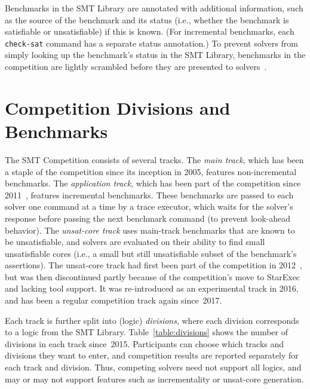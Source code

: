 \documentclass[twoside,11pt]{article}
\begin{document}
Benchmarks in the SMT Library are annotated with additional
information, such as the source of the benchmark and its status (i.e.,
whether the benchmark is satisfiable or unsatisfiable) if this is
known.  (For incremental benchmarks, each {\tt check-sat} command has
a separate status annotation.)  To prevent solvers from simply looking
up the benchmark's status in the SMT Library, benchmarks in the
competition are lightly scrambled before they are presented to
solvers~\cite{DBLP:conf/cade/Weber16}.


\section{Competition Divisions and Benchmarks}
\label{sec:benchmarks}

The SMT Competition consists of several tracks.  The \emph{main
  track}, which has been a staple of the competition since its
inception in 2005, features non-incremental benchmarks.  The
\emph{application track}, which has been part of the competition since
2011~\cite{BDdMOS13}, features incremental benchmarks.  These
benchmarks are passed to each solver one command at a time by a trace
executor, which waits for the solver's response before passing the
next benchmark command (to prevent look-ahead behavior).  The
\emph{unsat-core track} uses main-track benchmarks that are known to
be unsatisfiable, and solvers are evaluated on their ability to find
small unsatisfiable cores (i.e., a small but still unsatisfiable
subset of the benchmark's assertions).  The unsat-core track had first
been part of the competition in 2012~\cite{CGBD12}, but was then
discontinued partly because of the competition's move to StarExec and
lacking tool support.  It was re-introduced as an experimental track
in 2016, and has been a regular competition track again since~2017.

Each track is further split into (logic) \emph{divisions}, where each
division corresponds to a logic from the SMT Library.
Table~\ref{table:divisions} shows the number of divisions in each
track since~2015.  Participants can choose which tracks and divisions
they want to enter, and competition results are reported separately
for each track and division.  Thus, competing solvers need not support
all logics, and may or may not support features such as incrementality
or unsat-core generation.
\end{document}
